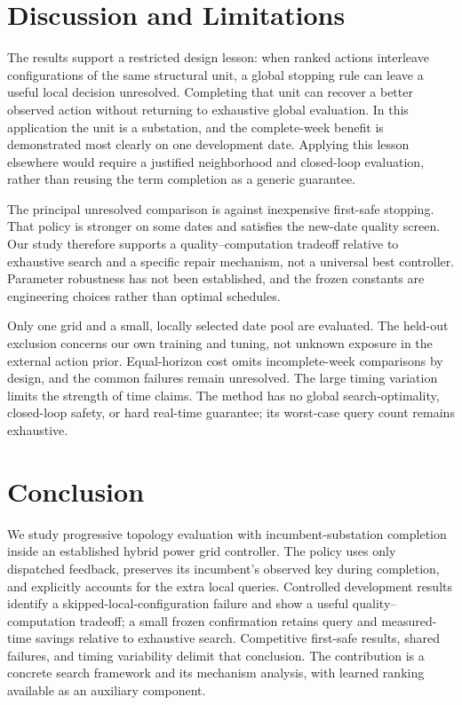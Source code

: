 \section{Discussion and Limitations}

The results support a restricted design lesson: when ranked actions interleave configurations of the same structural unit, a global stopping rule can leave a useful local decision unresolved. Completing that unit can recover a better observed action without returning to exhaustive global evaluation. In this application the unit is a substation, and the complete-week benefit is demonstrated most clearly on one development date. Applying this lesson elsewhere would require a justified neighborhood and closed-loop evaluation, rather than reusing the term completion as a generic guarantee.


The principal unresolved comparison is against inexpensive first-safe stopping. That policy is stronger on some dates and satisfies the new-date quality screen. Our study therefore supports a quality--computation tradeoff relative to exhaustive search and a specific repair mechanism, not a universal best controller. Parameter robustness has not been established, and the frozen constants are engineering choices rather than optimal schedules.


Only one grid and a small, locally selected date pool are evaluated. The held-out exclusion concerns our own training and tuning, not unknown exposure in the external action prior. Equal-horizon cost omits incomplete-week comparisons by design, and the common failures remain unresolved. The large timing variation limits the strength of time claims. The method has no global search-optimality, closed-loop safety, or hard real-time guarantee; its worst-case query count remains exhaustive.


\section{Conclusion}

We study progressive topology evaluation with incumbent-substation completion inside an established hybrid power grid controller. The policy uses only dispatched feedback, preserves its incumbent's observed key during completion, and explicitly accounts for the extra local queries. Controlled development results identify a skipped-local-configuration failure and show a useful quality--computation tradeoff; a small frozen confirmation retains query and measured-time savings relative to exhaustive search. Competitive first-safe results, shared failures, and timing variability delimit that conclusion. The contribution is a concrete search framework and its mechanism analysis, with learned ranking available as an auxiliary component.


